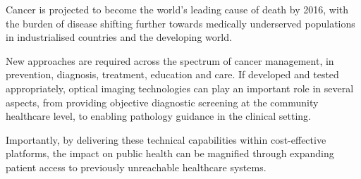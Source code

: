 Cancer is projected to become the world's leading cause of death by 2016, with the burden of disease shifting further towards medically underserved populations in industrialised countries and the developing world.

New approaches are required across the spectrum of cancer management, in prevention, diagnosis, treatment, education and care. If developed and tested appropriately, optical imaging technologies can play an important role in several aspects, from providing objective diagnostic screening at the community healthcare level, to enabling pathology guidance in the clinical setting.

Importantly, by delivering these technical capabilities within cost-effective platforms, the impact on public health can be magnified through expanding patient access to previously unreachable healthcare systems.